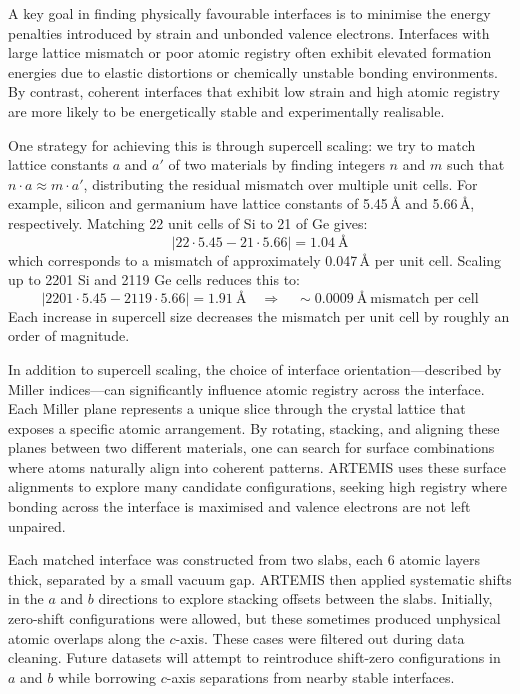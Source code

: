 A key goal in finding physically favourable interfaces is to minimise the energy penalties introduced by strain and unbonded valence electrons. Interfaces with large lattice mismatch or poor atomic registry often exhibit elevated formation energies due to elastic distortions or chemically unstable bonding environments. By contrast, coherent interfaces that exhibit low strain and high atomic registry are more likely to be energetically stable and experimentally realisable.

One strategy for achieving this is through supercell scaling: we try to match lattice constants $a$ and $a'$ of two materials by finding integers $n$ and $m$ such that $n \cdot a \approx m \cdot a'$, distributing the residual mismatch over multiple unit cells. For example, silicon and germanium have lattice constants of 5.45\,\AA{} and 5.66\,\AA{}, respectively. Matching 22 unit cells of Si to 21 of Ge gives:
\[
|22 \cdot 5.45 - 21 \cdot 5.66| = 1.04~\text{\AA}
\]
which corresponds to a mismatch of approximately 0.047\,\AA{} per unit cell. Scaling up to 2201 Si and 2119 Ge cells reduces this to:
\[
|2201 \cdot 5.45 - 2119 \cdot 5.66| = 1.91~\text{\AA} \quad \Rightarrow \quad \sim 0.0009~\text{\AA}~\text{mismatch per cell}
\]
Each increase in supercell size decreases the mismatch per unit cell by roughly an order of magnitude.

In addition to supercell scaling, the choice of interface orientation—described by Miller indices—can significantly influence atomic registry across the interface. Each Miller plane represents a unique slice through the crystal lattice that exposes a specific atomic arrangement. By rotating, stacking, and aligning these planes between two different materials, one can search for surface combinations where atoms naturally align into coherent patterns. ARTEMIS uses these surface alignments to explore many candidate configurations, seeking high registry where bonding across the interface is maximised and valence electrons are not left unpaired.

Each matched interface was constructed from two slabs, each 6 atomic layers thick, separated by a small vacuum gap. ARTEMIS then applied systematic shifts in the $a$ and $b$ directions to explore stacking offsets between the slabs. Initially, zero-shift configurations were allowed, but these sometimes produced unphysical atomic overlaps along the $c$-axis. These cases were filtered out during data cleaning. Future datasets will attempt to reintroduce shift-zero configurations in $a$ and $b$ while borrowing $c$-axis separations from nearby stable interfaces.

